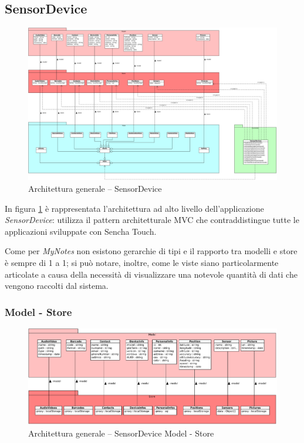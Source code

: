 \subsection{SensorDevice}
\begin{figure}[htb]
\centering
\includegraphics[scale=0.4,angle=90]{gfx/class/SensorDevice.pdf}
\caption{Architettura generale -- SensorDevice}
\label{fig:architettura SensorDevice}
\end{figure}

In figura \ref{fig:architettura SensorDevice} è rappresentata l'architettura ad alto livello dell'applicazione \emph{SensorDevice}: utilizza il pattern architetturale \ac{MVC} che contraddistingue tutte le applicazioni sviluppate con Sencha Touch.

Come per \emph{MyNotes} non esistono gerarchie di tipi e il rapporto tra modelli e store è sempre di 1 a 1; si può notare, inoltre, come le viste siano particolarmente articolate a causa della necessità di visualizzare una notevole quantità di dati che vengono raccolti dal sistema.


\subsubsection{Model - Store}
\begin{figure}[htb]
\centering
\includegraphics[scale=0.4]{gfx/class/SensorDevice_Model_Store.pdf}
\caption{Architettura generale -- SensorDevice Model - Store}
\label{fig:architettura SensorDevice Model-Store}
\end{figure}

